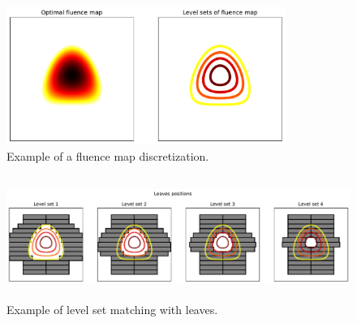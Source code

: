 \begin{figure}
	\centering
	\includegraphics[height=4.5cm]{_fluence_map_discretization.pdf}
	\caption{Example of a fluence map discretization.}
	\label{fig:fluence_map_discretization}
\end{figure}
\begin{figure}
	\centering
	\includegraphics[height=4cm]{_level_set_matching_with_leaves.pdf}
	\caption{Example of level set matching with leaves.}
	\label{fig:level_set_matching_with_leaves}
\end{figure}
